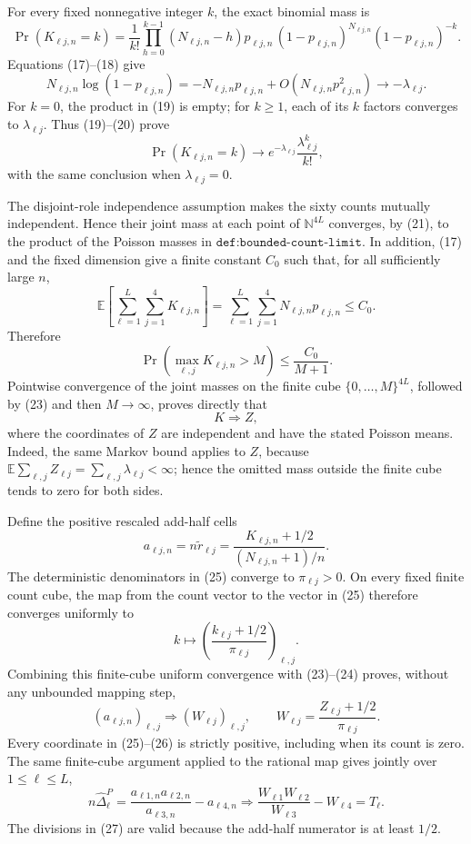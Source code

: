 For every fixed nonnegative integer \(k\), the exact binomial mass is
\[
\Pr(K_{\ell j,n}=k)
=\frac1{k!}\prod_{h=0}^{k-1}(N_{\ell j,n}-h)p_{\ell j,n}
\,(1-p_{\ell j,n})^{N_{\ell j,n}}(1-p_{\ell j,n})^{-k}.
\tag{19}
\]
Equations (17)--(18) give
\[
N_{\ell j,n}\log(1-p_{\ell j,n})
=-N_{\ell j,n}p_{\ell j,n}+O(N_{\ell j,n}p_{\ell j,n}^2)
\longrightarrow-\lambda_{\ell j}.
\tag{20}
\]
For \(k=0\), the product in (19) is empty; for \(k\geq1\), each of its \(k\) factors converges to \(\lambda_{\ell j}\).  Thus (19)--(20) prove
\[
\Pr(K_{\ell j,n}=k)
\longrightarrow e^{-\lambda_{\ell j}}\frac{\lambda_{\ell j}^k}{k!},
\tag{21}
\]
with the same conclusion when \(\lambda_{\ell j}=0\).

The disjoint-role independence assumption makes the sixty counts mutually independent.  Hence their joint mass at each point of \(\mathbb N^{4L}\) converges, by (21), to the product of the Poisson masses in \(\texttt{def:bounded-count-limit}\).  In addition, (17) and the fixed dimension give a finite constant \(C_0\) such that, for all sufficiently large \(n\),
\[
\mathbb E\!\left[\sum_{\ell=1}^{L}\sum_{j=1}^{4}K_{\ell j,n}\right]
=\sum_{\ell=1}^{L}\sum_{j=1}^{4}N_{\ell j,n}p_{\ell j,n}
\leq C_0.
\tag{22}
\]
Therefore
\[
\Pr\!\left(\max_{\ell,j}K_{\ell j,n}>M\right)
\leq\frac{C_0}{M+1}.
\tag{23}
\]
Pointwise convergence of the joint masses on the finite cube \(\{0,\ldots,M\}^{4L}\), followed by (23) and then \(M\to\infty\), proves directly that
\[
K\Rightarrow Z,
\tag{24}
\]
where the coordinates of \(Z\) are independent and have the stated Poisson means.  Indeed, the same Markov bound applies to \(Z\), because \(\mathbb E\sum_{\ell,j}Z_{\ell j}=\sum_{\ell,j}\lambda_{\ell j}<\infty\); hence the omitted mass outside the finite cube tends to zero for both sides.

Define the positive rescaled add-half cells
\[
a_{\ell j,n}=n\widetilde r_{\ell j}
=\frac{K_{\ell j,n}+1/2}{(N_{\ell j,n}+1)/n}.
\tag{25}
\]
The deterministic denominators in (25) converge to \(\pi_{\ell j}>0\).  On every fixed finite count cube, the map from the count vector to the vector in (25) therefore converges uniformly to
\[
k\longmapsto\left(\frac{k_{\ell j}+1/2}{\pi_{\ell j}}\right)_{\ell,j}.
\]
Combining this finite-cube uniform convergence with (23)--(24) proves, without any unbounded mapping step,
\[
(a_{\ell j,n})_{\ell,j}\Rightarrow
(W_{\ell j})_{\ell,j},
\qquad W_{\ell j}=\frac{Z_{\ell j}+1/2}{\pi_{\ell j}}.
\tag{26}
\]
Every coordinate in (25)--(26) is strictly positive, including when its count is zero.  The same finite-cube argument applied to the rational map gives jointly over \(1\leq\ell\leq L\),
\[
n\widehat\Delta^P_{\ell}
=\frac{a_{\ell1,n}a_{\ell2,n}}{a_{\ell3,n}}-a_{\ell4,n}
\Rightarrow
\frac{W_{\ell1}W_{\ell2}}{W_{\ell3}}-W_{\ell4}
=T_{\ell}.
\tag{27}
\]
The divisions in (27) are valid because the add-half numerator is at least \(1/2\).


